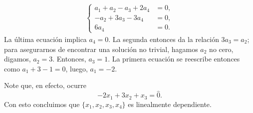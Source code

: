 \begin{align*}
\begin{cases}
a_{1} + a_{2} - a_{3} + 2a_{4}& = 0, \\
-a_{2} + 3a_{3} -3a_{4} & = 0, \\
6a_{4} & = 0.
\end{cases}
\end{align*}
La última ecuación implica $a_{4} = 0$.
La segunda entonces da la relación $3a_{3} = a_{2}$; para asegurarnos
de encontrar una solución no trivial, hagamos $a_{2}$ no cero,
digamos, $a_{2} = 3$. Entonces, $a_{3} = 1$. La primera ecuación
se reescribe entonces como $a_{1} + 3 -1 = 0$, luego,
$a_{1} = -2$.

Note que, en efecto, ocurre
\[
-2x_{1} + 3x_{2} + x_{3} = \hat{0}. 
\]
Con esto concluimos que $\{ x_{1}, x_{2}, x_{3}, x_{4} \}$
es linealmente dependiente. \diam

